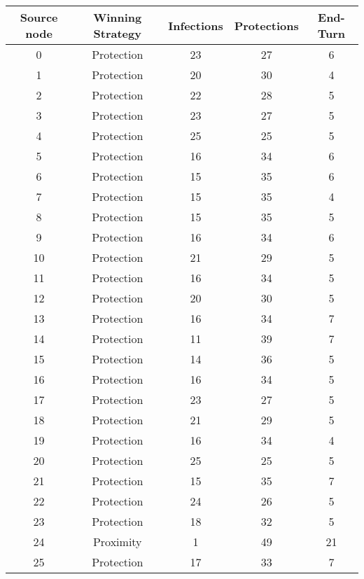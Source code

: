 \documentclass[results.tex]{subfiles}
\begin{document}
\begin{center}
  \begin{tabular}{| c || c | c | c | c |}
    \hline
    {\bfseries Source node} & {\bfseries Winning Strategy} & {\bfseries Infections} & {\bfseries Protections} & {\bfseries End-Turn} \\  %
    \hline\hline
    0 & Protection & 23 & 27 & 6 \\ 
    \hline
    1 & Protection & 20 & 30 & 4 \\ 
    \hline
    2 & Protection & 22 & 28 & 5 \\ 
    \hline
    3 & Protection & 23 & 27 & 5 \\ 
    \hline
    4 & Protection & 25 & 25 & 5 \\ 
    \hline
    5 & Protection & 16 & 34 & 6 \\ 
    \hline
    6 & Protection & 15 & 35 & 6 \\ 
    \hline
    7 & Protection & 15 & 35 & 4 \\ 
    \hline
    8 & Protection & 15 & 35 & 5 \\ 
    \hline
    9 & Protection & 16 & 34 & 6 \\ 
    \hline
    10 & Protection & 21 & 29 & 5 \\ 
    \hline
    11 & Protection & 16 & 34 & 5 \\ 
    \hline
    12 & Protection & 20 & 30 & 5 \\ 
    \hline
    13 & Protection & 16 & 34 & 7 \\ 
    \hline
    14 & Protection & 11 & 39 & 7 \\ 
    \hline
    15 & Protection & 14 & 36 & 5 \\ 
    \hline
    16 & Protection & 16 & 34 & 5 \\ 
    \hline
    17 & Protection & 23 & 27 & 5 \\ 
    \hline
    18 & Protection & 21 & 29 & 5 \\ 
    \hline
    19 & Protection & 16 & 34 & 4 \\ 
    \hline
    20 & Protection & 25 & 25 & 5 \\ 
    \hline
    21 & Protection & 15 & 35 & 7 \\ 
    \hline
    22 & Protection & 24 & 26 & 5 \\ 
    \hline
    23 & Protection & 18 & 32 & 5 \\ 
    \hline
    24 & Proximity & 1 & 49 & 21 \\ 
    \hline
    25 & Protection & 17 & 33 & 7 \\ 

\end{tabular}
\end{center}
\end{document}
